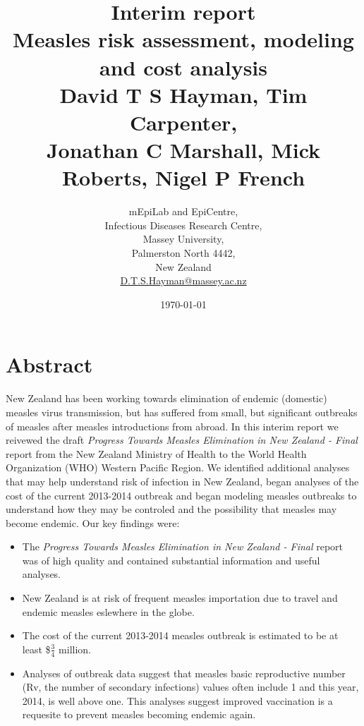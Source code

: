 \documentclass{article}
\begin{document}


\title{Interim report\\ Measles risk assessment, modeling and cost analysis\\ \vspace{2 mm} {\large David T S Hayman, Tim Carpenter,\\ Jonathan C Marshall, Mick Roberts, Nigel P French}}
\author{mEpiLab and EpiCentre,\\ Infectious Diseases Research Centre,\\
Massey University,\\
Palmerston North 4442,\\
New Zealand\\
\href{mailto: D.T.S.Hayman@massey.ac.nz}{D.T.S.Hayman@massey.ac.nz}}  %
\date{\today}  %
\maketitle

\section{Abstract}

New Zealand has been working towards elimination of endemic (domestic) measles virus transmission, but has suffered from small, but significant outbreaks of measles after measles introductions from abroad. In this interim report we reivewed the draft \emph {Progress Towards Measles Elimination in New Zealand - Final} report from the New Zealand Ministry of Health to the World Health Organization (WHO) Western Pacific Region. We identified additional analyses that may help understand risk of infection in New Zealand, began analyses of the cost of the current 2013-2014 outbreak and began modeling measles outbreaks to understand how they may be controled and the possibility that measles may become endemic. Our key findings were:
\begin{itemize}
\item The \emph {Progress Towards Measles Elimination in New Zealand - Final} report was of high quality and contained substantial information and useful analyses.
\item New Zealand is at risk of frequent measles importation due to travel and endemic measles eslewhere in the globe.
\item The cost of the current 2013-2014 measles outbreak is estimated to be at least \$$\frac{3}{4}$ million.
\item Analyses of outbreak data suggest that measles basic reproductive number (Rv, the number of secondary infections) values often include 1 and this year, 2014, is well above one. This analyses suggest improved vaccination is a requesite to prevent measles becoming endemic again.
\end{itemize}
\end{document}
